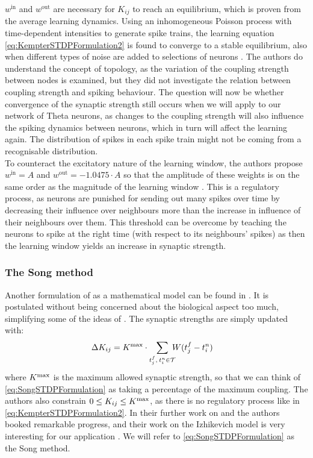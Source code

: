 $w^{\mathrm{in}}$ and $w^{\mathrm{out}}$ are necessary for $K_{ij}$ to reach an equilibrium, which is proven from the average learning dynamics. Using an inhomogeneous Poisson process with time-dependent intensities to generate spike trains, the learning equation \eqref{eq:KempterSTDPFormulation2} is found to converge to a stable equilibrium, also when different types of noise are added to selections of neurons \cite{Kempter1999}. The authors do understand the concept of topology, as the variation of the coupling strength between nodes is examined, but they did not investigate the relation between coupling strength and spiking behaviour. The question will now be whether convergence of the synaptic strength still occurs when we will apply \STDP to our network of Theta neurons, as changes to the coupling strength will also influence the spiking dynamics between neurons, which in turn will affect the learning again. The distribution of spikes in each spike train might not be coming from a recognisable distribution.\\

To counteract the excitatory nature of the learning window, the authors propose $w^{\mathrm{in}} = A$ and $w^{\mathrm{out}} = -1.0475 \cdot A$ so that the amplitude of these weights is on the same order as the magnitude of the learning window \cite{Kempter1999}. This is a regulatory process, as neurons are punished for sending out  many spikes over time by decreasing their influence over neighbours more than the increase in influence of their neighbours over them. This threshold can be overcome by teaching the neurons to spike at the right time (with respect to its neighbours' spikes) as then the learning window yields an increase in synaptic strength.%


\subsubsection{The Song method}
Another formulation of \STDP as a mathematical model can be found in \cite{Song2000}. It is postulated without being concerned about the biological aspect too much, simplifying some of the ideas of \cite{Kempter1999}. The synaptic strengths are simply updated with:
\begin{align}
\Delta K_{ij} &= K^{\rm max} \cdot \sum_{t_{j}^{f}, \: t_i^{n} \in \mathcal{T}} \hspace{-2mm} W (t_{j}^{f}-t_i^{n} ) \label{eq:SongSTDPFormulation}
\end{align}
where $K^{\rm max}$ is the maximum allowed synaptic strength, so that we can think of \eqref{eq:SongSTDPFormulation} as taking a percentage of the maximum coupling. The authors also constrain $0 \leq K_{ij} \leq K^{\rm max}$, as there is no regulatory process like in \eqref{eq:KempterSTDPFormulation2}. In their further work on \STDP and \IP the authors booked remarkable progress, and their work on the Izhikevich model is very interesting for our application \cite{Song2017}. We will refer to \eqref{eq:SongSTDPFormulation} as the Song method. 


